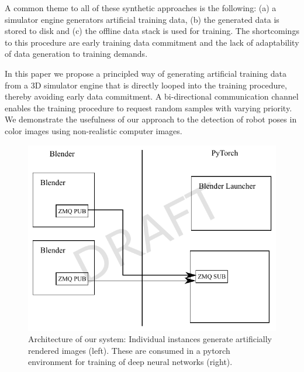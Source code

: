 \documentclass[conference]{IEEEtran}
\begin{document}
A common theme to all of these synthetic approaches is the following: (a) a simulator engine generators artificial training data, (b) the generated data is stored to disk and (c) the offline data stack is used for training. The shortcomings to this procedure are early training data commitment and the lack of adaptability of data generation to training demands.

In this paper we propose a principled way of generating artificial training data from a 3D simulator engine that is directly looped into the training procedure, thereby avoiding early data commitment. A bi-directional communication channel enables the training procedure to request random samples with varying priority. We demonstrate the usefulness of our approach to the detection of robot poses in color images using non-realistic computer images.









\begin{figure}[htbp]
\centerline{\includegraphics[width=\columnwidth]{figures/architecture/architecture.pdf}}
\caption{\label{fig:architecture} Architecture of our system: Individual instances generate artificially rendered images (left). These are consumed in a pytorch environment for training of deep neural networks (right).}
\label{fig}
\end{figure}
\end{document}

